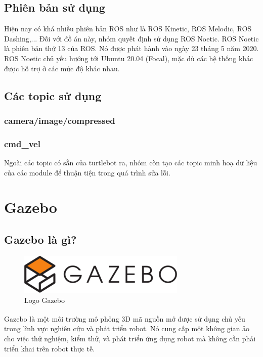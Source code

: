 \subsection{Phiên bản sử dụng}
\tab Hiện nay có khá nhiều phiên bản ROS như là ROS Kinetic, ROS Melodic, ROS Dashing,... Đối với đồ án này, nhóm quyết định sử dụng ROS Noetic. ROS Noetic là phiên bản thứ 13 của ROS. Nó được phát hành vào ngày 23 tháng 5 năm 2020. ROS Noetic chủ yếu hướng tới Ubuntu 20.04 (Focal), mặc dù các hệ thống khác được hỗ trợ ở các mức độ khác nhau.
\subsection{Các topic sử dụng}
\subsubsection{camera/image/compressed}
\subsubsection{cmd\_vel}
Ngoài các topic có sẵn của turtlebot ra, nhóm còn tạo các topic minh hoạ dữ liệu của các module để thuận tiện trong quá trình sửa lỗi.
\section{Gazebo}
\subsection{Gazebo là gì?}
\begin{figure}[h]
\begin{center}
\includegraphics[width=8cm]{img/2_Theory/gazebo.png}
\caption{Logo Gazebo}
\end{center}
\end{figure}
\hspace{0.4cm}Gazebo\textsuperscript{\cite{gazebo}} là một môi trường mô phỏng 3D mã nguồn mở được sử dụng chủ yếu trong lĩnh vực nghiên cứu và phát triển robot. Nó cung cấp một không gian ảo cho việc thử nghiệm, kiểm thử, và phát triển ứng dụng robot mà không cần phải triển khai trên robot thực tế.
